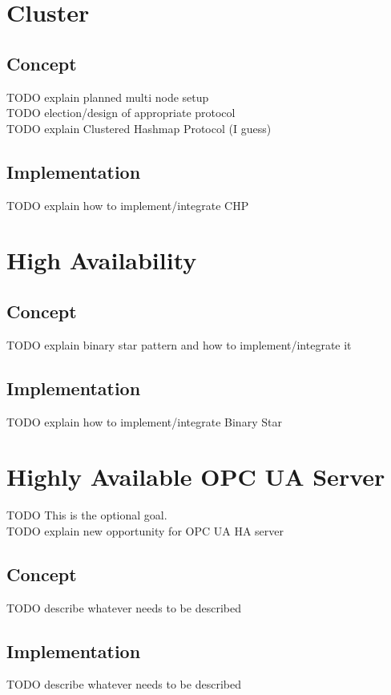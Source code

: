 \documentclass[a4paper]{report}
\begin{document}
\chapter{Cluster}\label{ch:cluster}
\section{Concept}
TODO explain planned multi node setup\\
TODO election/design of appropriate protocol\\
TODO explain Clustered Hashmap Protocol (I guess)\\

\section{Implementation}
TODO explain how to implement/integrate CHP

\chapter{High Availability}\label{ch:ha}

\section{Concept}
TODO explain binary star pattern and how to implement/integrate it

\section{Implementation}
TODO explain how to implement/integrate Binary Star

\chapter{Highly Available OPC UA Server}\label{ch:opc-ua-server}
TODO This is the optional goal.\\
TODO explain new opportunity for OPC UA HA server

\section{Concept}
TODO describe whatever needs to be described

\section{Implementation}
TODO describe whatever needs to be described
\end{document}
